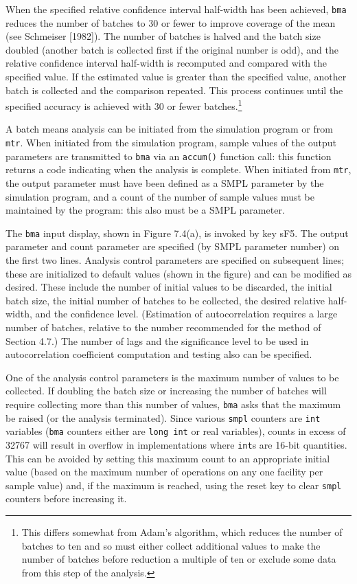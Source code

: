 When the specified relative confidence interval half-width has been
achieved, \texttt{bma} reduces the number of batches to 30 or fewer to improve
coverage of the mean (see Schmeiser [1982]). The number of batches is
halved and the batch size doubled (another batch is collected first if the
original number is odd), and the relative confidence interval half-width is
recomputed and compared with the specified value. If the estimated value
is greater than the specified value, another batch is collected and the
comparison repeated. This process continues until the specified accuracy is
achieved with 30 or fewer batches.\footnote{This differs somewhat from Adam's algorithm, which reduces the number of batches to ten and so must either collect additional values to make the number of batches before reduction a multiple of ten or exclude some data from this step of the analysis.}

A batch means analysis can be initiated from the simulation program or
from \texttt{mtr}. When initiated from the simulation program, sample values of
the output parameters are transmitted to \texttt{bma} via an \texttt{accum()} function call:
this function returns a code indicating when the analysis is complete. When
initiated from \texttt{mtr}, the output parameter must have been defined as a SMPL
parameter by the simulation program, and a count of the number of sample
values must be maintained by the program: this also must be a SMPL
parameter.

The \texttt{bma} input display, shown in Figure 7.4(a), is invoked by key sF5.
The output parameter and count parameter are specified (by SMPL parameter
number) on the first two lines. Analysis control parameters are specified
on subsequent lines; these are initialized to default values (shown in the
figure) and can be modified as desired. These include the number of initial
values to be discarded, the initial batch size, the initial number of batches
to be collected, the desired relative half-width, and the confidence level.
(Estimation of autocorrelation requires a large number of batches, relative to
the number recommended for the method of Section 4.7.) The number of lags
and the significance level to be used in autocorrelation coefficient computation
and testing also can be specified.

One of the analysis control parameters is the maximum number of values
to be collected. If doubling the batch size or increasing the number of batches
will require collecting more than this number of values, \texttt{bma} asks that the
maximum be raised (or the analysis terminated). Since various \texttt{smpl} counters
are \texttt{int} variables (\texttt{bma} counters either are \texttt{long int} or real variables),
counts in excess of 32767 will result in overflow in implementations where
\texttt{int}s are 16-bit quantities. This can be avoided by setting this maximum
count to an appropriate initial value (based on the maximum number of operations
on any one facility per sample value) and, if the maximum is reached,
using the reset key to clear \texttt{smpl} counters before increasing it.

